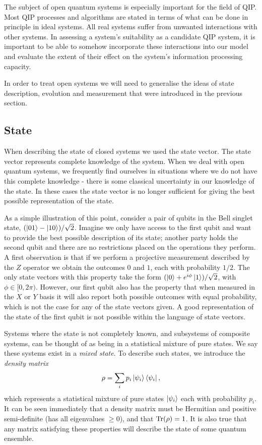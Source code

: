The subject of open quantum systems is especially important for the field of QIP. Most QIP processes and algorithms are stated in terms of what can be done in principle in ideal systems. All real systems suffer from unwanted interactions with other systems. In assessing a system's suitability as a candidate QIP system, it is important to be able to somehow incorporate these interactions into our model and evaluate the extent of their effect on the system's information processing capacity.

In order to treat open systems we will need to generalise the ideas of state description, evolution and measurement that were introduced in the previous section.



\subsection{State}

When describing the state of closed systems we used the state vector. The state vector represents complete knowledge of the system. When we deal with open quantum systems, we frequently find ourselves in situations where we do not have this complete knowledge - there is some classical uncertainty in our knowledge of the state. In these cases the state vector is no longer sufficient for giving the best possible representation of the state. 

As a simple illustration of this point, consider a pair of qubits in the Bell singlet state, $(\left\vert01\right\rangle - \left\vert10\right\rangle)/\sqrt{2}$. Imagine we only have access to the first qubit and want to provide the best possible description of its state; another party holds the second qubit and there are no restrictions placed on the operations they perform. A first observation is that if we perform a projective measurement described by the $Z$ operator we obtain the outcomes $0$ and $1$, each with probability $1/2$. The only state vectors with this property take the form $(\left\vert0\right\rangle + e^{i\phi}\left\vert1\right\rangle)/\sqrt{2}$, with $\phi \in [0, 2\pi)$. However, our first qubit also has the property that when measured in the $X$ or $Y$ basis it will also report both possible outcomes with equal probability, which is not the case for any of the state vectors given. A good representation of the state of the first qubit is not possible within the language of state vectors.

Systems where the state is not completely known, and subsystems of composite systems, can be thought of as being in a statistical mixture of pure states. We say these systems exist in a \textit{mixed state}. To describe such states, we introduce the \textit{density matrix}
\begin{align}
  \rho = \sum_i p_i \left\vert\psi_i\right\rangle\left\langle \psi_i\right\vert,
\end{align}
which represents a statistical mixture of pure states $\left\vert\psi_i\right\rangle$ each with probability $p_i$. It can be seen immediately that a density matrix must be Hermitian and positive semi-definite (has all eigenvalues $\geq 0$), and that $\operatorname{Tr}(\rho) = 1$. It is also true that any matrix satisfying these properties will describe the state of some quantum ensemble.

